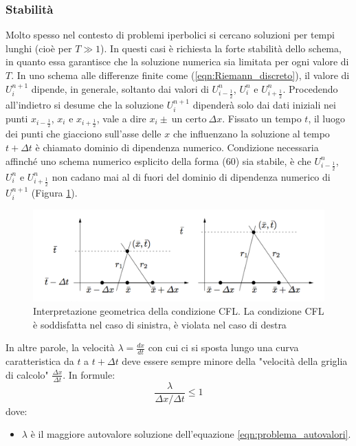 \documentclass[12pt]{article} %
\begin{document}
\subsubsection{Stabilità}
\noindent Molto spesso nel contesto di problemi iperbolici si cercano soluzioni per tempi lunghi (cioè per $T\gg1$). In questi casi è richiesta la forte stabilità dello schema, in quanto essa garantisce che la soluzione numerica sia limitata per ogni valore di $T$. In uno schema alle differenze finite come (\ref{eqn:Riemann_discreto}), il valore di $U_i^{n+1}$ dipende, in generale, soltanto dai valori di $U^{n}_{i-\frac{1}{2}}$, $U^{n}_{i}$ e $U^{n}_{i+\frac{1}{2}}$. Procedendo all'indietro si desume che la soluzione $U_i^{n+1}$ dipenderà solo dai dati iniziali nei punti $x_{i-\frac{1}{2}}$, $x_i$ e $x_{i+\frac{1}{2}}$, vale a dire $x_i\pm\:\textrm{un certo}\:\Delta x$. Fissato un tempo $t$, il luogo dei punti che giacciono sull'asse delle $x$ che influenzano la soluzione al tempo $t+\Delta t$ è chiamato dominio di dipendenza numerico. Condizione necessaria affinché uno schema numerico esplicito della forma (60) sia stabile, è che $U^{n}_{i-\frac{1}{2}}$, $U^{n}_{i}$ e $U^{n}_{i+\frac{1}{2}}$ non cadano mai al di fuori del dominio di dipendenza numerico di $U_i^{n+1}$ (Figura \ref{fig:CFL}). 
\begin{figure}
    \centering
    \includegraphics[width=\textwidth]{CFL.png}
    \caption{Interpretazione geometrica della condizione CFL. La condizione CFL è soddisfatta nel caso di sinistra, è violata nel caso di destra}
    \label{fig:CFL}
\end{figure}
\noindent In altre parole, la velocità $\lambda=\frac{dx}{dt}$ con cui ci si sposta lungo una curva caratteristica da $t$ a $t+\Delta t$ deve essere sempre minore della "velocità della griglia di calcolo" $\frac{\Delta x}{\Delta t}$. In formule:
\begin{equation}
    \frac{\lambda}{\Delta x/\Delta t}\leq1
    \label{eqn:Courant}
\end{equation}
\noindent dove:
\begin{itemize}
    \item $\lambda$ è il maggiore autovalore soluzione dell'equazione \ref{eqn:problema_autovalori}.
\end{itemize}
\end{document}
